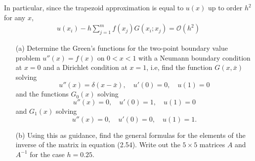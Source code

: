 \documentclass[10pt]{article}
\begin{document}
\begin{solution}[Solution]
\begin{enumerate}
        In particular, since the trapezoid approximation is equal to \( u(x) \) up to order \( h^2 \) for any \( x \), 
        \begin{align*}
            u(x_i) - h \sum_{j=1}^{m}f(x_j)G(x_i;x_j) = \mathcal{O}(h^2) \tag*{\qed}
        \end{align*}

\end{enumerate}

\end{solution}

\begin{problem}
\begin{enumerate}
    \item[(a)] Determine the Green's functions for the two-point boundary value problem \(u''(x) = f(x)\) on \(0<x<1\) with a Neumann boundary condition at \(x=0\) and a Dirichlet condition at \(x=1\), i.e, find the function \(G(x,\bar x)\) solving
\[
u''(x) = \delta(x-\bar x), \quad u'(0)=0, \quad u(1)=0
\]
and the functions \(G_0(x)\) solving
\[
u''(x) = 0, \quad u'(0)=1, \quad u(1)=0
\]
and \(G_1(x)\) solving
\[
u''(x) = 0, \quad u'(0)=0, \quad u(1)=1.
\]
    \item[(b)] Using this as guidance, find the general formulas for the elements of the inverse of the matrix in equation (2.54).  Write out the \(5\times 5\) matrices \(A\) and \(A^{-1}\) for the case \(h=0.25\).
\end{enumerate}
\end{problem}
\end{document}

